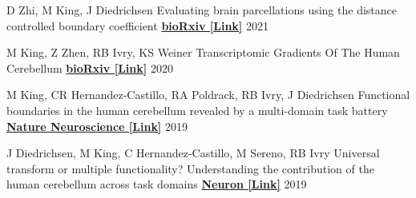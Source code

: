 \begin{cventries}

  \cventry
    {D Zhi, M King, J Diedrichsen} %
    {Evaluating brain parcellations using the distance controlled boundary coefficient} %
    {\href{https://www.biorxiv.org/content/10.1101/2021.05.11.443151v1.full.pdf}{\textbf{bioRxiv [Link]}}} %
    {2021} %
    {}

    
  \cventry
    {M King, Z Zhen, RB Ivry, KS Weiner} %
    {Transcriptomic Gradients Of The Human Cerebellum} %
    {\href{https://papers.ssrn.com/sol3/papers.cfm?abstract_id=3797269}{\textbf{bioRxiv [Link]}}} %
    {2020} %
    {}
    
  \cventry
    {M King, CR Hernandez-Castillo, RA Poldrack, RB Ivry, J Diedrichsen} %
    {Functional boundaries in the human cerebellum revealed by a multi-domain task battery} %
    {\href{http://ivrylab.berkeley.edu/uploads/4/1/1/5/41152143/functional_boundaries_in_the_human_cerebellum.pdf}{\textbf{Nature Neuroscience [Link]}}} %
    {2019} %
    {}
    
  \cventry
    {J Diedrichsen, M King, C Hernandez-Castillo, M Sereno, RB Ivry} %
    {Universal transform or multiple functionality? Understanding the contribution of the human cerebellum across task domains} %
    {\href{https://www.sciencedirect.com/science/article/pii/S0896627319303782}{\textbf{Neuron [Link]}}} %
    {2019} %
    {}
    
    
    

\end{cventries}
